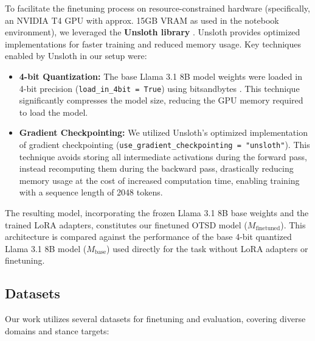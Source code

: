 \documentclass[twocolumn,11pt,letterpaper]{article}
\begin{document}
To facilitate the finetuning process on resource-constrained hardware (specifically, an NVIDIA T4 GPU with approx. 15GB VRAM as used in the notebook environment), we leveraged the \textbf{Unsloth library} \cite{unsloth}. Unsloth provides optimized implementations for faster training and reduced memory usage. Key techniques enabled by Unsloth in our setup were:
\begin{itemize}
    \item \textbf{4-bit Quantization:} The base Llama 3.1 8B model weights were loaded in 4-bit precision (\texttt{load\_in\_4bit = True}) using bitsandbytes . This technique significantly compresses the model size, reducing the GPU memory required to load the model.
    \item \textbf{Gradient Checkpointing:} We utilized Unsloth's optimized implementation of gradient checkpointing (\texttt{use\_gradient\_checkpointing = "unsloth"}). This technique avoids storing all intermediate activations during the forward pass, instead recomputing them during the backward pass, drastically reducing memory usage at the cost of increased computation time, enabling training with a sequence length of 2048 tokens.
\end{itemize}

The resulting model, incorporating the frozen Llama 3.1 8B base weights and the trained LoRA adapters, constitutes our finetuned OTSD model ($M_{\text{finetuned}}$). This architecture is compared against the performance of the base 4-bit quantized Llama 3.1 8B model ($M_{\text{base}}$) used directly for the task without LoRA adapters or finetuning.

\subsection{Datasets}
\label{sec:dataset}

Our work utilizes several datasets for finetuning and evaluation, covering diverse domains and stance targets:
\end{document}
